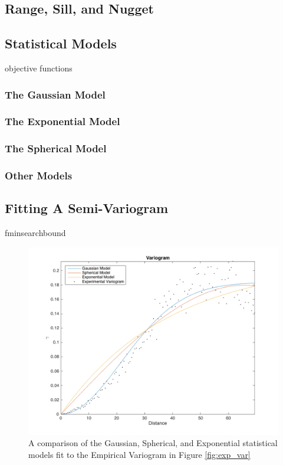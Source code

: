 \documentclass[11pt]{ucthesis}
\begin{document}
\subsection{Range, Sill, and Nugget}
\subsection{Statistical Models}
objective functions
\subsubsection{The Gaussian Model}
\subsubsection{The Exponential Model}
\subsubsection{The Spherical Model}
\subsubsection{Other Models}

\subsection{Fitting A Semi-Variogram}
fminsearchbound

\begin{figure}[H]
    \centering    
	\includegraphics[width=\linewidth]{figures/fit_kern_comp.png}
	\captionsetup{skip=0.5\baselineskip,size=footnotesize}
	\caption{A comparison of the Gaussian, Spherical, and Exponential statistical models fit to the Empirical Variogram in Figure \ref{fig:exp_var}}
	\label{fig:kern_fit}
\end{figure}
\end{document}
